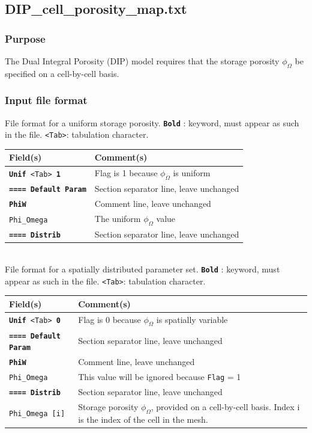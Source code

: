 \subsection{DIP\_cell\_porosity\_map.txt}\label{sec_Model!Hyperbolic!DIP!cellPorosityMap}
\subsubsection{Purpose}
The Dual Integral Porosity (DIP) model requires that the storage porosity $\phi_\Omega$ be specified on a cell-by-cell basis.
%
\subsubsection{Input file format}
%
File format for a uniform storage porosity.  \texttt{\textbf{Bold}} : keyword, must appear as such in the file. \texttt{<Tab>}: tabulation character. \\
    \begin{tabular}{p{6cm} | p{9cm}}
    \hline
    Field(s) & Comment(s) \\
    \hline  \hline
    \texttt{\textbf{Unif} <Tab> \textbf{1}} & Flag is 1 because $\phi_\Omega$ is uniform \\ \hline
    \texttt{\textbf{==== Default Param}} & Section separator line, leave unchanged \\  \hline
    \texttt{\textbf{PhiW}} & Comment line, leave unchanged \\  \hline
    \texttt{Phi\_Omega}     & The uniform $\phi_\Omega$ value \\ \hline
    \texttt{\textbf{==== Distrib}} & Section separator line, leave unchanged \\  \hline
    \end{tabular}
%
\vspace{10mm} \\
%
File format for a spatially distributed parameter set.  \texttt{\textbf{Bold}} : keyword, must appear as such in the file. \texttt{<Tab>}: tabulation character. \\
    \begin{tabular}{p{6cm} | p{9cm}}
    \hline
    Field(s) & Comment(s) \\
    \hline  \hline
    \texttt{\textbf{Unif} <Tab> \textbf{0}} & Flag is 0 because $\phi_\Omega$ is spatially variable \\ \hline
    \texttt{\textbf{==== Default Param}} & Section separator line, leave unchanged \\  \hline
    \texttt{\textbf{PhiW}} & Comment line, leave unchanged \\  \hline
    \texttt{Phi\_Omega}     & This value will be ignored because \texttt{Flag} = 1 \\ \hline
    \texttt{\textbf{==== Distrib}} & Section separator line, leave unchanged \\  \hline
    \texttt{Phi\_Omega [i]}      & Storage porosity $\phi_\Omega$, provided on a cell-by-cell basis. Index i is the index of the cell in the mesh.  \\ \hline
    \end{tabular}
%
